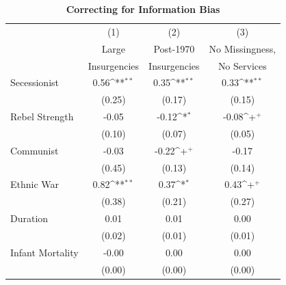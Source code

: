 \documentclass[12pt, letterpaper]{article}
\begin{document}
\newpage
\begin{table}[htbp]\centering
\begin{small}
\def\sym#1{\ifmmode^{#1}\else\(^{#1}\)\fi}
\renewcommand\thetable{A.\Roman{table}}
\caption{\textbf{Correcting for Information Bias }}
\makeatletter
\def\myrow{}
\CT@everycr{\noalign{%
\global\let\CT@row@color\relax
\stepcounter{mym8}%
\ifnum\value{mym8}=4
  \gdef\myrow{\rowcolor{gray!50}}
\else\ifnum\value{mym8}=6
  \gdef\myrow{}
\fi\fi
}\myrow}
\renewcommand\thetable{A.\Roman{table}}
\label{table:info}
\begin{tabular}{l*{3}{c}}
\hline\hline
 &\multicolumn{1}{c}{(1)}&\multicolumn{1}{c}{(2)}&\multicolumn{1}{c}{(3)}\\
                    &\multicolumn{1}{c}{Large}&\multicolumn{1}{c}{Post-1970}&\multicolumn{1}{c}{No Missingness,}\\
  &\multicolumn{1}{c}{Insurgencies}&\multicolumn{1}{c}{Insurgencies}&\multicolumn{1}{c}{No Services}\\
  \hline
Secessionist      &        0.56\sym{**} &        0.35\sym{**} &        0.33\sym{**} \\
                    &      (0.25)         &      (0.17)         &      (0.15)         \\
Rebel Strength      &       -0.05         &       -0.12\sym{*}  &       -0.08\sym{+}  \\
                    &      (0.10)         &      (0.07)         &      (0.05)         \\
Communist           &       -0.03         &       -0.22\sym{+}  &       -0.17         \\
                    &      (0.45)         &      (0.13)         &      (0.14)         \\
Ethnic War          &        0.82\sym{**} &        0.37\sym{*}  &        0.43\sym{+}  \\
                    &      (0.38)         &      (0.21)         &      (0.27)         \\
Duration            &        0.01         &        0.01         &        0.00         \\
                    &      (0.02)         &      (0.01)         &      (0.01)         \\
Infant Mortality    &       -0.00         &        0.00         &        0.00         \\
                    &      (0.00)         &      (0.00)         &      (0.00)         \\

\end{tabular}
\end{small}
\end{table}
\end{document}

